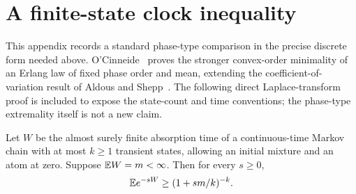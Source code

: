 \section{A finite-state clock inequality}\label{app:clock-order}
This appendix records a standard phase-type comparison in the precise discrete form needed above. O'Cinneide~\cite{OC} proves the stronger convex-order minimality of an Erlang law of fixed phase order and mean, extending the coefficient-of-variation result of Aldous and Shepp~\cite{AS}. The following direct Laplace-transform proof is included to expose the state-count and time conventions; the phase-type extremality itself is not a new claim.

\begin{lemma}\label{lem:phase-laplace}
Let $W$ be the almost surely finite absorption time of a continuous-time Markov chain with at most $k\ge1$ transient states, allowing an initial mixture and an atom at zero. Suppose $\mathbb E W=m<\infty$. Then for every $s\ge0$,
\begin{equation}\label{eq:phase-laplace}
 \mathbb E e^{-sW}\ge(1+sm/k)^{-k}.
\end{equation}
\end{lemma}
